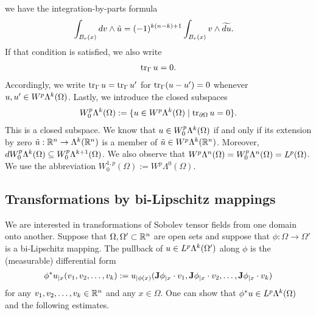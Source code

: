 \documentclass[10pt,a4paper]{article}
\newcommand\cye[1]{%
\protect\leavevmode
\begingroup
    \color{blue}%
    #1%
\endgroup
}
\begin{document}
we have the integration-by-parts formula
\begin{align*}
    \int_{B_r(x)} d v \wedge \tilde u
    &=
    (-1)^{k(n-k)+1}
    \int_{B_r(x)} v \wedge \widetilde{d u}
    .
\end{align*}
If that condition is satisfied, we also write 
\begin{align*}
    \operatorname{tr}_{\Gamma} u = 0
    .
\end{align*}
Accordingly, we write $\operatorname{tr}_{\Gamma} u = \operatorname{tr}_{\Gamma} u'$ for $\operatorname{tr}_{\Gamma} (u-u') = 0$ whenever $u, u' \in W^{p}\Lambda^{k}(\Omega)$.
Lastly, we introduce the closed subspaces 
\begin{gather*}
    W^{p}_{0}\Alt^{k}(\Omega) 
    := 
    \{ u \in W^{p}\Alt^{k}(\Omega) \suchthat \trace_{\partial \Omega} u = 0 \}
    .
\end{gather*}
This is a closed subspace. We know that $u \in W^{p}_{0}\Lambda^{k}(\Omega)$ if and only if its extension by zero $\tilde u : {\mathbb R}^{n} \rightarrow \Lambda^{k}({\mathbb R}^{n})$ is a member of $\tilde u \in W^{p}\Lambda^{k}({\mathbb R}^{n})$. Moreover, $d W^{p}_{0}\Lambda^{k}(\Omega) \subseteq W^{p}_{0}\Lambda^{k+1}(\Omega)$. We also observe that $W^{p}\Lambda^{n}(\Omega) = W^{p}_{0}\Lambda^{n}(\Omega) = L^{p}(\Omega)$. We use the abbreviation $W^{1,p}_{0}(\Omega) := W^{p}\Lambda^{0}(\Omega)$. 


\subsection{Transformations by bi-Lipschitz mappings}

We are interested in transformations of Sobolev tensor fields from one domain onto another. 
Suppose that $\Omega,\Omega' \subset {\mathbb R}^{n}$ are open sets and suppose that $\phi: \Omega \to \Omega'$ is a bi-Lipschitz mapping.
The pullback of $u \in L^{p}\Lambda^{k}(\Omega')$ along $\phi$ is the (measurable) differential form 
\begin{align}\label{equation:pullback}
    \phi^{\ast}u_{|x}( v_{1}, v_{2}, \ldots, v_{k} ) 
    := 
    u_{|\phi(x)}( {\mathbf{J}}\phi_{|x} \cdot v_1, {\mathbf{J}}\phi_{|x} \cdot v_2, \ldots, {\mathbf{J}}\phi_{|x} \cdot v_k ) 
\end{align}
for any $v_1, v_2, \dots, v_k \in {\mathbb R}^{n}$ and any $x \in \Omega$. 
One can show that $\phi^{\ast}u \in L^{p}\Lambda^{k}(\Omega)$ and the following estimates.
\end{document}
